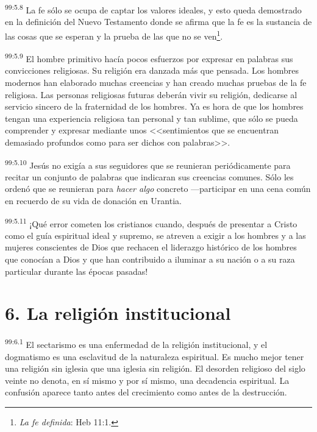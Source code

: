 \par
\textsuperscript{99:5.8} La fe sólo se ocupa de captar los valores ideales, y esto queda demostrado en la definición del Nuevo Testamento donde se afirma que la fe es la sustancia de las cosas que se esperan y la prueba de las que no se ven\footnote{\textit{La fe definida}: Heb 11:1.}.

\par
\textsuperscript{99:5.9} El hombre primitivo hacía pocos esfuerzos por expresar en palabras sus convicciones religiosas. Su religión era danzada más que pensada. Los hombres modernos han elaborado muchas creencias y han creado muchas pruebas de la fe religiosa. Las personas religiosas futuras deberán vivir su religión, dedicarse al servicio sincero de la fraternidad de los hombres. Ya es hora de que los hombres tengan una experiencia religiosa tan personal y tan sublime, que sólo se pueda comprender y expresar mediante unos <<sentimientos que se encuentran demasiado profundos como para ser dichos con palabras>>.

\par
\textsuperscript{99:5.10} Jesús no exigía a sus seguidores que se reunieran periódicamente para recitar un conjunto de palabras que indicaran sus creencias comunes. Sólo les ordenó que se reunieran para \textit{hacer algo} concreto ---participar en una cena común en recuerdo de su vida de donación en Urantia.

\par
\textsuperscript{99:5.11} ¡Qué error cometen los cristianos cuando, después de presentar a Cristo como el guía espiritual ideal y supremo, se atreven a exigir a los hombres y a las mujeres conscientes de Dios que rechacen el liderazgo histórico de los hombres que conocían a Dios y que han contribuido a iluminar a su nación o a su raza particular durante las épocas pasadas!

\section*{6. La religión institucional}
\par
\textsuperscript{99:6.1} El sectarismo es una enfermedad de la religión institucional, y el dogmatismo es una esclavitud de la naturaleza espiritual. Es mucho mejor tener una religión sin iglesia que una iglesia sin religión. El desorden religioso del siglo veinte no denota, en sí mismo y por sí mismo, una decadencia espiritual. La confusión aparece tanto antes del crecimiento como antes de la destrucción.

